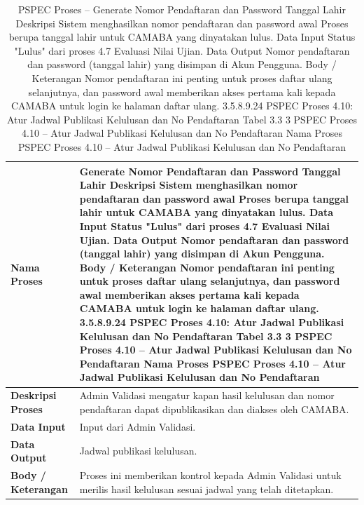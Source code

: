 \begin{longtable}{|p{}|p{}|}
	\caption{PSPEC Proses  -- Generate Nomor Pendaftaran dan Password Tanggal Lahir Deskripsi Sistem menghasilkan nomor pendaftaran dan password awal Proses berupa tanggal lahir untuk CAMABA yang dinyatakan lulus. Data Input Status "Lulus" dari proses 4.7 Evaluasi Nilai Ujian. Data Output Nomor pendaftaran dan password (tanggal lahir) yang disimpan di Akun Pengguna. Body / Keterangan Nomor pendaftaran ini penting untuk proses daftar ulang selanjutnya, dan password awal memberikan akses pertama kali kepada CAMABA untuk login ke halaman daftar ulang. 3.5.8.9.24 PSPEC Proses 4.10: Atur Jadwal Publikasi Kelulusan dan No Pendaftaran Tabel 3.3 3 PSPEC Proses 4.10 – Atur Jadwal Publikasi Kelulusan dan No Pendaftaran Nama Proses PSPEC Proses 4.10 – Atur Jadwal Publikasi Kelulusan dan No Pendaftaran}
	\label{table:3.pspec}\\
	\hline
	\textbf{Nama Proses} & Generate Nomor Pendaftaran dan Password Tanggal Lahir Deskripsi Sistem menghasilkan nomor pendaftaran dan password awal Proses berupa tanggal lahir untuk CAMABA yang dinyatakan lulus. Data Input Status "Lulus" dari proses 4.7 Evaluasi Nilai Ujian. Data Output Nomor pendaftaran dan password (tanggal lahir) yang disimpan di Akun Pengguna. Body / Keterangan Nomor pendaftaran ini penting untuk proses daftar ulang selanjutnya, dan password awal memberikan akses pertama kali kepada CAMABA untuk login ke halaman daftar ulang. 3.5.8.9.24 PSPEC Proses 4.10: Atur Jadwal Publikasi Kelulusan dan No Pendaftaran Tabel 3.3 3 PSPEC Proses 4.10 – Atur Jadwal Publikasi Kelulusan dan No Pendaftaran Nama Proses PSPEC Proses 4.10 – Atur Jadwal Publikasi Kelulusan dan No Pendaftaran \\
	\hline
	\textbf{Deskripsi Proses} & Admin Validasi mengatur kapan hasil kelulusan dan nomor pendaftaran dapat dipublikasikan dan diakses oleh CAMABA. \\
	\hline
	\textbf{Data Input} & Input dari Admin Validasi. \\
	\hline
	\textbf{Data Output} & Jadwal publikasi kelulusan. \\
	\hline
	\textbf{Body / Keterangan} & Proses ini memberikan kontrol kepada Admin Validasi untuk merilis hasil kelulusan sesuai jadwal yang telah ditetapkan. \\
	\hline
\end{longtable}


